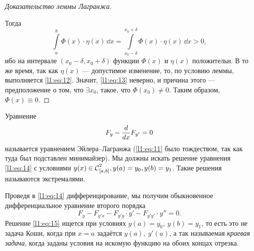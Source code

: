 \begin{proof}[Доказательство леммы Лагранжа]
\begin{figure}[H]
\begin{tikzpicture}[x=0.75pt,y=0.75pt,yscale=-1,xscale=1]
		
	\end{tikzpicture}
	\caption{}
	\label{l1:fig:6}
\end{figure}
Тогда
	\begin{equation}
		\label{l1:eq:13}
		\int\limits_a^b \Phi(x)\cdot\eta(x)\,\dd{x}=\int\limits_{x_0-\delta}^{x_0+\delta} \Phi(x)\cdot\eta(x)\,\dd{x}>0,
	\end{equation}
	ибо на интервале $(x_0-\delta,x_0+\delta)$ функции $\Phi(x)$ и $\eta(x)$ положительн{}. В то же время, так как $\eta(x)$ --- допустимое изменение, то{\mb,} по условию леммы{\mb,} выполняется \eqref{l1:eq:12}. Значит, \eqref{l1:eq:13} неверно{\mb,} и причина этого --- предположение о том, что $\exists x_0${\mb,} такое, что $\Phi(x_0)\neq0$. Таким образом{\mb,} $\Phi(x)\equiv0$.
\end{proof}

Уравнение
\begin{equation}
	\label{l1:eq:14}
	 F_y-\der{}{x}F_{y'}=0
\end{equation} 
называется уравнением Эйлера--Лагранжа (\eqref{l1:eq:11} было тождеством, так как туда был подставлен минимайзер). Мы должны искать решение уравнения \eqref{l1:eq:14} с условиями $y(x)\in\Cfn[{[a,b]}]{2}, y(a)=y_0, y(b)=y_1$. Такие решения называются экстремалями.

Проведя в \eqref{l1:eq:14} дифференцирование, мы получим обыкновенное дифференциальное уравнение второго порядка 
\begin{equation}
	\label{l1:eq:15}
	 F_y-F_{y'x}-F_{y'y}\cdot y'-F_{y'y'}\cdot y''=0.
\end{equation}
Решение \eqref{l1:eq:15} ищется при условиях $y(a)=y_0,\ y(b)=y_1$, то есть это не задача Коши, когда при $x=a$ задаётся $y(a),\ y'(a)$, а так называемая \emph{краевая задача}, когда заданы условия на искомую функцию на обоих концах отрезка.
\vspace{0.2cm}

